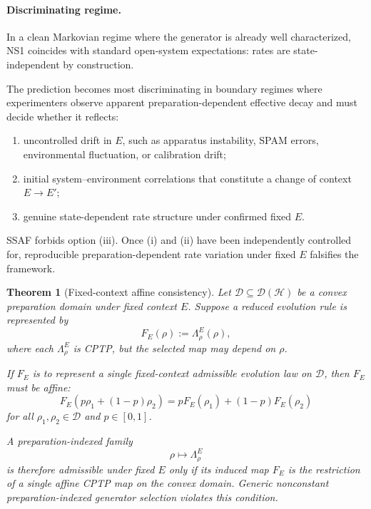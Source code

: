 \documentclass[aps,prx,onecolumn,11pt]{revtex4-2}
\theoremstyle{plain}
\newtheorem{theorem}{Theorem}
\theoremstyle{definition}
\theoremstyle{remark}
\begin{document}
\paragraph{Discriminating regime.}

In a clean Markovian regime where the generator is already well
characterized, NS1 coincides with standard open-system expectations:
rates are state-independent by construction.

The prediction becomes most discriminating in boundary regimes where
experimenters observe apparent preparation-dependent effective decay
and must decide whether it reflects:

\begin{enumerate}[label=(\roman*), leftmargin=2.2em]
\item uncontrolled drift in \(E\), such as apparatus instability, SPAM
errors, environmental fluctuation, or calibration drift;
\item initial system--environment correlations that constitute a
change of context \(E\to E'\);
\item genuine state-dependent rate structure under confirmed fixed
\(E\).
\end{enumerate}

SSAF forbids option (iii). Once (i) and (ii) have been independently
controlled for, reproducible preparation-dependent rate variation under
fixed \(E\) falsifies the framework.

\begin{theorem}[Fixed-context affine consistency]
\label{thm:fixed_context_affine_consistency}
Let \(\mathcal D\subseteq\mathcal D(\mathcal H)\) be a convex
preparation domain under fixed context \(E\). Suppose a reduced
evolution rule is represented by
\[
F_E(\rho):=\Lambda_\rho^E(\rho),
\]
where each \(\Lambda_\rho^E\) is CPTP, but the selected map may depend
on \(\rho\).

If \(F_E\) is to represent a single fixed-context admissible evolution
law on \(\mathcal D\), then \(F_E\) must be affine:
\begin{equation}
F_E(p\rho_1+(1-p)\rho_2)
=
pF_E(\rho_1)+(1-p)F_E(\rho_2)
\label{eq:fixed_context_affine_requirement}
\end{equation}
for all \(\rho_1,\rho_2\in\mathcal D\) and \(p\in[0,1]\).

A preparation-indexed family
\[
\rho\mapsto\Lambda_\rho^E
\]
is therefore admissible under fixed \(E\) only if its induced map
\(F_E\) is the restriction of a single affine CPTP map on the convex
domain. Generic nonconstant preparation-indexed generator selection
violates this condition.
\end{theorem}
\end{document}

